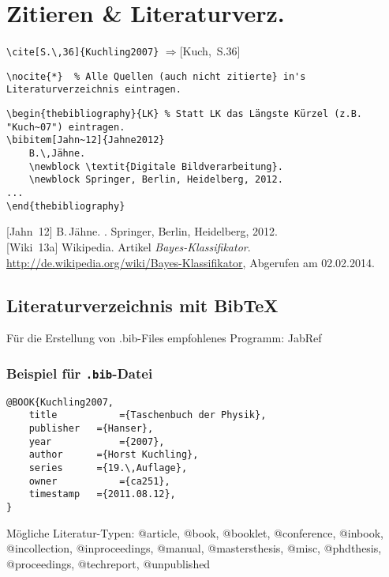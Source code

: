 
\columnbreak
\section[Zitieren \& Literaturverzeichnis]{Zitieren \& Literaturverz. }

\lstinline|\cite[S.\,36]{Kuchling2007}| \linebreak $\Rightarrow$[Kuch,~S.36]

\noindent\lstinline|\nocite{*}	% Alle Quellen (auch nicht zitierte} in's Literaturverzeichnis eintragen.|

\negAbstand
\begin{lstlisting}
\begin{thebibliography}{LK} % Statt LK das Längste Kürzel (z.B. "Kuch~07") eintragen.
\bibitem[Jahn~12]{Jahne2012}
	B.\,Jähne.
	\newblock \textit{Digitale Bildverarbeitung}.
	\newblock Springer, Berlin, Heidelberg, 2012.
...
\end{thebibliography}
\end{lstlisting}



	[Jahn~12]
	B.\,Jähne.
	.
	\newblock Springer, Berlin, Heidelberg, 2012.\\[1ex]
	[Wiki~13a]	Wikipedia. 
	\newblock Artikel {\itshape Bayes-Klassifikator}.
	\newblock \url{http://de.wikipedia.org/wiki/Bayes-Klassifikator},
	\newblock Abgerufen am 02.02.2014.
\negAbstand

\subsection{Literaturverzeichnis mit BibTeX}
Für die Erstellung von .bib-Files empfohlenes Programm: JabRef \newline
\lstinline|| \newline
\lstinline||
\negAbstand

\subsubsection*{Beispiel für \nolinkurl{.bib}-Datei}
\negAbstand
\begin{lstlisting}
@BOOK{Kuchling2007,
	title			={Taschenbuch der Physik},
	publisher	={Hanser},
	year			={2007},
	author		={Horst Kuchling},
	series		={19.\,Auflage},
	owner			={ca251},
	timestamp	={2011.08.12},
}
\end{lstlisting}
%
Mögliche Literatur-Typen: @article, @book, @booklet, @conference, @inbook, @incollection, @inproceedings, @manual, @mastersthesis, @misc, @phdthesis, @proceedings, @techreport, @unpublished

